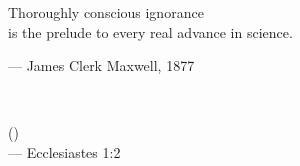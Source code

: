 \begin{flushright}
\begin{hangleftquote}{\QENOpen}{\QENClose}
Thoroughly conscious ignorance\\
is the prelude to every real advance in science.
\end{hangleftquote}
\par\smallskip
\normalfont — James Clerk Maxwell, 1877
\end{flushright}
\vspace{2em}
\begin{flushright}
\begin{hebrew}
\emph{} \\
\end{hebrew}
()\\
— Ecclesiastes 1:2
\end{flushright}

